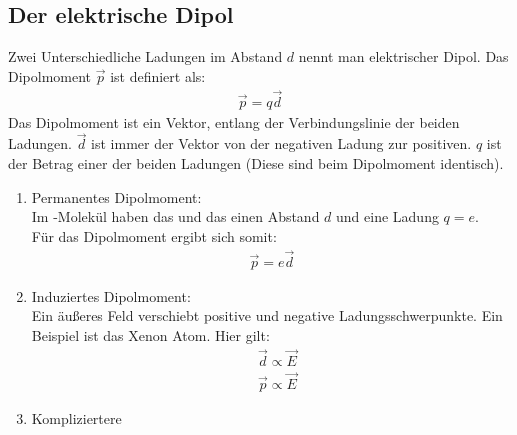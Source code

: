 \documentclass{article}
\begin{document}
\subsection{Der elektrische Dipol}
Zwei Unterschiedliche Ladungen im Abstand $d$ nennt man elektrischer Dipol.
Das Dipolmoment $\vec{p}$ ist definiert als:
\begin{align}
    \vec{p}=q\vec{d}
\end{align}
Das Dipolmoment ist ein Vektor, entlang der Verbindungslinie der beiden Ladungen.
$\vec{d}$ ist immer der Vektor von der negativen Ladung zur positiven. $q$ ist der Betrag einer der
beiden Ladungen (Diese sind beim Dipolmoment identisch).
\begin{enumerate}
    \item Permanentes Dipolmoment:\\
    Im -Molekül haben das  und das  einen Abstand $d$ und eine Ladung $q=e$.\\
    Für das Dipolmoment ergibt sich somit:
    \begin{align}
        \vec{p}=e\vec{d}
    \end{align}
    \item Induziertes Dipolmoment:\\
        Ein äußeres Feld verschiebt positive und negative Ladungsschwerpunkte.
        Ein Beispiel ist das Xenon Atom. Hier gilt:
        \begin{align}
            &\vec{d}\propto \vec{E}\\
            &\vec{p}\propto \vec{E}
        \end{align}
    \item Kompliziertere
\end{enumerate}
\end{document}

